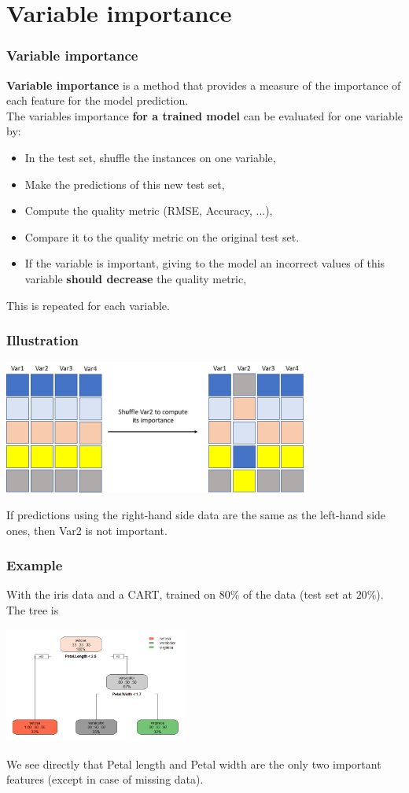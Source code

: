 \section{Variable importance}
\begin{frame}
\frametitle{Variable importance}
{\bf Variable importance} is a method that provides a measure of the importance of each feature for the model prediction.\\
\vspace{0.3cm}
The variables importance {\bf for a trained model} can be evaluated for one variable by:
\begin{itemize}
\item In the test set, shuffle the instances on one variable,
\item Make the predictions of this new test set,
\item Compute the quality metric (RMSE, Accuracy, ...),
\item Compare it to the quality metric on the original test set.
\item If the variable is important, giving to the model an incorrect values of this variable {\bf should decrease} the quality metric,
\end{itemize}
This is repeated for each variable.
\end{frame}
\begin{frame}
\frametitle{Illustration}
\begin{center}
\includegraphics[width=10cm]{../Graphs/VI_Illustr.png}
\end{center}
If predictions using the right-hand side data are the same as the left-hand side ones, then Var2 is not important.
\end{frame}
\begin{frame}
\frametitle{Example}
With the iris data and a CART, trained on $80\%$ of the data (test set at $20\%$). The tree is
\begin{center}
\includegraphics[width=6cm]{../Graphs/VarImp_iris_CART.png}
\end{center}
We see directly that Petal length and Petal width are the only two important features (except in case of missing data). 
\end{frame}
